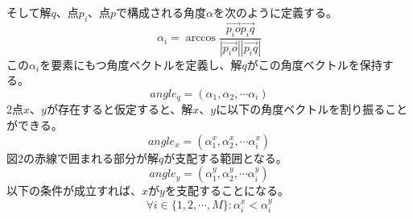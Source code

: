 \documentclass[10pt, a4paper, titlepage]{jarticle}
\begin{document}
そして解$q$、点$p_{i}$、点$p$で構成される角度$\alpha$を次のように定義する。
\begin{equation}
\alpha_i=\arccos{\frac{\vec{p_{i}o} \vec{p_{i}q}}{|\vec{p_{i}o}| |\vec{p_{i}q}|}}
\end{equation}
この$\alpha_i$を要素にもつ角度ベクトルを定義し、解$q$がこの角度ベクトルを保持する。
\begin{equation}
angle_{q}=\left(\alpha_1,\alpha_2,\cdots \alpha_i \right)
\end{equation}
2点$x$、$y$が存在すると仮定すると、解$x$、$y$に以下の角度ベクトルを割り振ることができる。
\begin{equation}
angle_{x}=\left(\alpha^{x}_1,\alpha^{x}_2,\cdots \alpha^{x}_i \right)
\end{equation}
図2の赤線で囲まれる部分が解$q$が支配する範囲となる。
\begin{equation}
angle_{y}=\left(\alpha^{y}_1,\alpha^{y}_2,\cdots \alpha^{y}_i \right)
\end{equation}
以下の条件が成立すれば、$x$が$y$を支配することになる。
\begin{equation}
\forall i \in {\{1,2, \cdots,M}\}:\alpha^{x}_{i}< \alpha^{y}_{i}
\end{equation}

\end{document}
